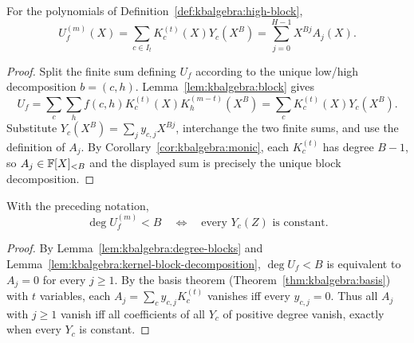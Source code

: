 \begin{lemma}\label{lem:kbalgebra:kernel-block-decomposition}
For the polynomials of Definition~\ref{def:kbalgebra:high-block},
\[
 U_f^{(m)}(X)=\sum_{c\in I_t}K_c^{(t)}(X)Y_c(X^{B})
 =\sum_{j=0}^{H-1}X^{Bj}A_j(X).
\]
\end{lemma}
\begin{proof}
Split the finite sum defining $U_f$ according to the unique low/high decomposition $b=(c,h)$. Lemma~\ref{lem:kbalgebra:block} gives
\[
 U_f=\sum_c\sum_hf(c,h)K_c^{(t)}(X)K_h^{(m-t)}(X^B)
 =\sum_cK_c^{(t)}(X)Y_c(X^B).
\]
Substitute $Y_c(X^B)=\sum_jy_{c,j}X^{Bj}$, interchange the two finite sums, and use the definition of $A_j$. By Corollary~\ref{cor:kbalgebra:monic}, each $K_c^{(t)}$ has degree $B-1$, so $A_j\in\mathbb{F}[X]_{<B}$ and the displayed sum is precisely the unique block decomposition.
\end{proof}

\begin{lemma}\label{lem:kbalgebra:high-constant}
With the preceding notation,
\[
 \deg U_f^{(m)}<B
 \quad\Longleftrightarrow\quad
 \text{every }Y_c(Z)\text{ is constant.}
\]
\end{lemma}
\begin{proof}
By Lemma~\ref{lem:kbalgebra:degree-blocks} and Lemma~\ref{lem:kbalgebra:kernel-block-decomposition}, $\deg U_f<B$ is equivalent to $A_j=0$ for every $j\geq1$. By the basis theorem (Theorem~\ref{thm:kbalgebra:basis}) with $t$ variables, each $A_j=\sum_cy_{c,j}K_c^{(t)}$ vanishes iff every $y_{c,j}=0$. Thus all $A_j$ with $j\geq1$ vanish iff all coefficients of all $Y_c$ of positive degree vanish, exactly when every $Y_c$ is constant.
\end{proof}

